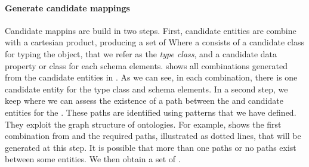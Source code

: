 \begin{table}[]
	\centering
	\caption{Combinations of generated entities for type class and schema elements}
	\label{tab:overviewCombinationsElements}
\end{table}

\paragraph{Generate candidate mappings}
Candidate mappins are build in two steps.
First, candidate entities are combine with a cartesian product, producing a set of 
Where a  consists of a candidate class for typing the object, that we refer as the \emph{type class}, and a candidate data property or class for each schema elements.
 shows all combinations generated from the candidate entities in . As we can see, in each combination, there is one candidate entity for the type class and schema elements.
In a second step, we keep  where we can assess the existence of a path between the  and candidate entities for the . These paths are identified using patterns that we have defined. They exploit the graph structure of ontologies. 
For example,  shows the first combination from  and the required paths, illustrated as dotted lines, that will be generated at this step. It is possible that more than one paths or no paths exist between some entities. 
We then obtain a set of .


